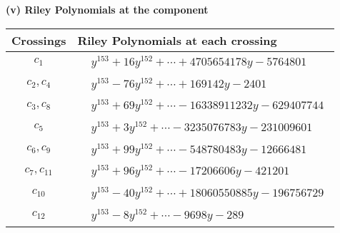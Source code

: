 \documentclass[1p]{elsarticle_modified}
\theoremstyle{definition}
\begin{document}
\newpage\renewcommand{\arraystretch}{1}
\flushleft \textbf{(v) Riley Polynomials at the component}\newline \\
\begin{tabular}{m{50pt}|m{274pt}}
Crossings & \hspace{64pt}Riley Polynomials at each crossing \\
\hline $$\begin{aligned}c_{1}\end{aligned}$$&$\begin{aligned}
&y^{153}+16 y^{152}+\cdots+4705654178 y-5764801
\end{aligned}$\\
\hline $$\begin{aligned}c_{2},c_{4}\end{aligned}$$&$\begin{aligned}
&y^{153}-76 y^{152}+\cdots+169142 y-2401
\end{aligned}$\\
\hline $$\begin{aligned}c_{3},c_{8}\end{aligned}$$&$\begin{aligned}
&y^{153}+69 y^{152}+\cdots-16338911232 y-629407744
\end{aligned}$\\
\hline $$\begin{aligned}c_{5}\end{aligned}$$&$\begin{aligned}
&y^{153}+3 y^{152}+\cdots-3235076783 y-231009601
\end{aligned}$\\
\hline $$\begin{aligned}c_{6},c_{9}\end{aligned}$$&$\begin{aligned}
&y^{153}+99 y^{152}+\cdots-548780483 y-12666481
\end{aligned}$\\
\hline $$\begin{aligned}c_{7},c_{11}\end{aligned}$$&$\begin{aligned}
&y^{153}+96 y^{152}+\cdots-17206606 y-421201
\end{aligned}$\\
\hline $$\begin{aligned}c_{10}\end{aligned}$$&$\begin{aligned}
&y^{153}-40 y^{152}+\cdots+18060550885 y-196756729
\end{aligned}$\\
\hline $$\begin{aligned}c_{12}\end{aligned}$$&$\begin{aligned}
&y^{153}-8 y^{152}+\cdots-9698 y-289
\end{aligned}$\\
\hline
\end{tabular}\\~\\
\end{document}
